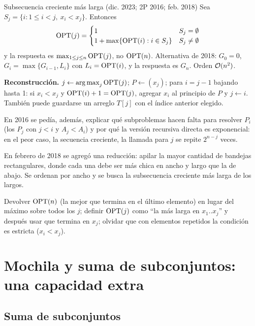 \begin{problema}{Subsecuencia creciente más larga (dic. 2023; 2P 2016; feb. 2018)}
Sea $S_j=\{i: 1\le i<j,\ x_i<x_j\}$. Entonces
\[
\mathrm{OPT}(j)=\begin{cases}1 & S_j=\emptyset\\ 1+\max\{\mathrm{OPT}(i): i\in S_j\} & S_j\ne\emptyset\end{cases}
\]
y la respuesta es $\max_{1\le j\le n}\mathrm{OPT}(j)$, no $\mathrm{OPT}(n)$. Alternativa de
2018: $G_0=0$, $G_i=\max\{G_{i-1},L_i\}$ con $L_i=\mathrm{OPT}(i)$, y la respuesta es
$G_n$. Orden $\mathcal{O}(n^2)$.

\textbf{Reconstrucción.} $j\gets\operatorname*{arg\,max}_j\mathrm{OPT}(j)$; $P\gets(x_j)$; para
$i=j-1$ bajando hasta 1: si $x_i<x_j$ y $\mathrm{OPT}(i)+1=\mathrm{OPT}(j)$, agregar $x_i$ al
principio de $P$ y $j\gets i$. También puede guardarse un arreglo $T[j]$ con el
índice anterior elegido.
\end{problema}

En 2016 se pedía, además, explicar qué subproblemas hacen falta para resolver
$P_i$ (los $P_j$ con $j<i$ y $A_j<A_i$) y por qué la versión recursiva
directa es exponencial: en el peor caso, la secuencia creciente, la llamada
para $j$ se repite $2^{n-j}$ veces.

En febrero de 2018 se agregó una reducción: apilar la mayor cantidad de
bandejas rectangulares, donde cada una debe ser más chica en ancho y largo
que la de abajo. Se ordenan por ancho y se busca la subsecuencia creciente más
larga de los largos.

\begin{trampa}
Devolver $\mathrm{OPT}(n)$ (la mejor que termina en el último elemento) en lugar del
máximo sobre todos los $j$; definir $\mathrm{OPT}(j)$ como ``la más larga en
$x_1..x_j$'' y después usar que termina en $x_j$; olvidar que con elementos
repetidos la condición es estricta ($x_i<x_j$).
\end{trampa}

\section{Mochila y suma de subconjuntos: una capacidad extra}

\subsection{Suma de subconjuntos}

